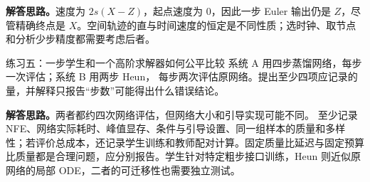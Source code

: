 \textbf{解答思路。}速度为 $2s(X-Z)$，起点速度为 0，因此一步
Euler 输出仍是 $Z$，尽管精确终点是 $X$。空间轨迹的直与时间速度的恒定是不同性质；选时钟、取节点和分析少步精度都需要考虑后者。

\begin{exercisebox}{练习五：一步学生和一个高阶求解器如何公平比较}
系统 A 用四步蒸馏网络，每步一次评估；系统 B 用两步 Heun，
每步两次评估原网络。提出至少四项应记录的量，并解释只报告“步数”可能得出什么错误结论。
\end{exercisebox}

\textbf{解答思路。}两者都约四次网络评估，但网络大小和引导实现可能不同。
至少记录 NFE、网络实际耗时、峰值显存、条件与引导设置、同一组样本的质量和多样性；若评价总成本，还记录学生训练和教师配对计算。固定质量比延迟与固定预算比质量都是合理问题，应分别报告。学生针对特定粗步接口训练，Heun 则近似原网络的局部 ODE，二者的可迁移性也需要独立测试。

